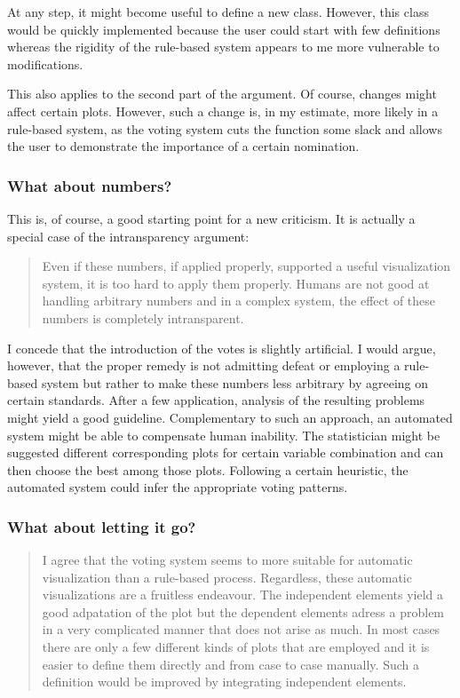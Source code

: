 \documentclass[]{report}
\theoremstyle{definition}
\theoremstyle{definition}
\theoremstyle{definition}
\theoremstyle{remark}
\begin{document}
At any step, it might become useful to define a new class. However, this
class would be quickly implemented because the user could start with few
definitions whereas the rigidity of the rule-based system appears to me
more vulnerable to modifications.

This also applies to the second part of the argument. Of course, changes
might affect certain plots. However, such a change is, in my estimate,
more likely in a rule-based system, as the voting system cuts the
function some slack and allows the user to demonstrate the importance of
a certain nomination.

\subsubsection{What about numbers?}\label{what-about-numbers}

This is, of course, a good starting point for a new criticism. It is
actually a special case of the intransparency argument:

\begin{quote}
Even if these numbers, if applied properly, supported a useful
visualization system, it is too hard to apply them properly. Humans are
not good at handling arbitrary numbers and in a complex system, the
effect of these numbers is completely intransparent.
\end{quote}

I concede that the introduction of the votes is slightly artificial. I
would argue, however, that the proper remedy is not admitting defeat or
employing a rule-based system but rather to make these numbers less
arbitrary by agreeing on certain standards. After a few application,
analysis of the resulting problems might yield a good guideline.
Complementary to such an approach, an automated system might be able to
compensate human inability. The statistician might be suggested
different corresponding plots for certain variable combination and can
then choose the best among those plots. Following a certain heuristic,
the automated system could infer the appropriate voting patterns.

\subsubsection{What about letting it
go?}\label{what-about-letting-it-go}

\begin{quote}
I agree that the voting system seems to more suitable for automatic
visualization than a rule-based process. Regardless, these automatic
visualizations are a fruitless endeavour. The independent elements yield
a good adpatation of the plot but the dependent elements adress a
problem in a very complicated manner that does not arise as much. In
most cases there are only a few different kinds of plots that are
employed and it is easier to define them directly and from case to case
manually. Such a definition would be improved by integrating independent
elements.
\end{quote}
\end{document}
